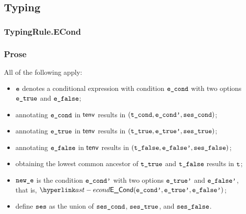 \begin{mathpar}
\end{mathpar}

\subsection{Typing}
\subsubsection{TypingRule.ECond \label{sec:TypingRule.ECond}}
\subsubsection{Prose}
All of the following apply:
\begin{itemize}
  \item $\ve$ denotes a conditional expression with condition $\econd$ with two options $\etrue$ and $\efalse$;
  \item annotating $\econd$ in $\tenv$ results in $(\tcond, \econdp, \vsescond)$\ProseOrTypeError;
  \item annotating $\etrue$ in $\tenv$ results in $(\ttrue, \etruep, \vsestrue)$\ProseOrTypeError;
  \item annotating $\efalse$ in $\tenv$ results in $(\tfalse, \efalsep, \vsesfalse)$;
  \item obtaining the lowest common ancestor of $\ttrue$ and $\tfalse$ results in $\vt$\ProseOrTypeError;
  \item $\newe$ is the condition $\econdp$ with two options $\etruep$ and $\efalsep$, that is, $\ECond(\econdp, \etruep, \efalsep)$;
  \item define $\vses$ as the union of $\vsescond$, $\vsestrue$, and $\vsesfalse$.
\end{itemize}
